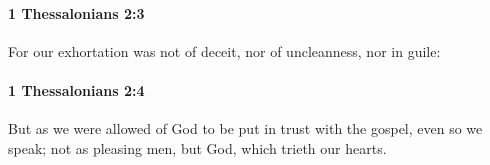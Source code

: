 		\paragraph{1 Thessalonians 2:3} %
			\label{1THESSALONIANS-2-3}

			For our exhortation was not of deceit, nor of uncleanness, nor in guile:

			\begin{framed}
			\scriptsize
				\begin{compactdesc}
					\item[SBLG] 
				\end{compactdesc}
			\end{framed}

		\paragraph{1 Thessalonians 2:4} %
			\label{1THESSALONIANS-2-4}

			But as we were allowed of God to be put in trust with the gospel, even so we speak; not as pleasing men, but God, which trieth our hearts.

